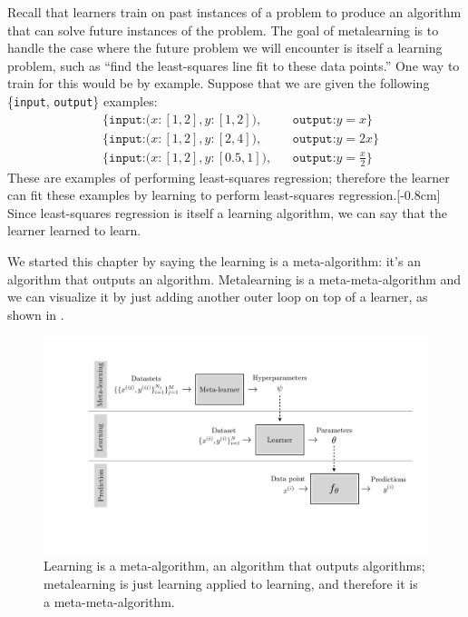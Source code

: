 Recall that learners train on past instances of a problem to produce an algorithm that can solve future instances of the problem. The goal of metalearning is to handle the case where the future problem we will encounter is itself a learning problem, such as ``find the least-squares line fit to these data points.'' One way to train for this would be by example. Suppose that we are given the following \{\texttt{input}, \texttt{output}\} examples:
\begin{align}
    &\{\texttt{input:} \big(x:[1,2], y:[1,2]\big), &&\texttt{output:} y = x\}\nonumber \\
    &\{\texttt{input:} \big(x:[1,2], y:[2,4]\big), &&\texttt{output:} y = 2x\}\nonumber \\
    &\{\texttt{input:} \big(x:[1,2], y:[0.5,1]\big), &&\texttt{output:} y = \frac{x}{2}\}\nonumber
\end{align}
These are examples of performing least-squares regression; therefore the learner can fit these examples by learning to perform least-squares regression.[-0.8cm] Since least-squares regression is itself a learning algorithm, we can say that the learner learned to learn.

We started this chapter by saying the learning is a meta-algorithm: it's an algorithm that outputs an algorithm. Metalearning is a meta-meta-algorithm and we can visualize it by just adding another outer loop on top of a learner, as shown in \fig{\ref{fig:intro_to_learning:meta_learning_diagram}}.
\begin{figure}[h]
    \centerline{
    \includegraphics[width=1.0\linewidth]{./figures/intro_to_learning/meta_learning_diagram.pdf}
    }
    \caption{Learning is a meta-algorithm, an algorithm that outputs algorithms; metalearning is just learning applied to learning, and therefore it is a meta-meta-algorithm.}
    \label{fig:intro_to_learning:meta_learning_diagram}
\end{figure}

